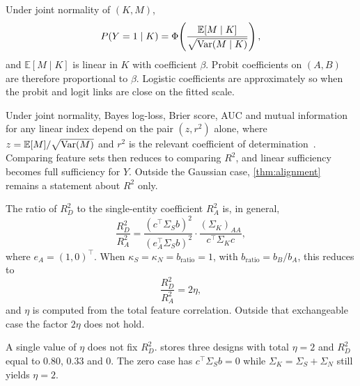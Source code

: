 \begin{lemma}
\label{lem:bridge}
Under joint normality of $(K,M)$,
\[
  P(Y=1\mid K)
  = \Phi\!\left(\frac{\mathbb{E}[M\mid K]}{\sqrt{\operatorname{Var}(M\mid K)}}\right),
\]
and $\mathbb{E}[M\mid K]$ is linear in $K$ with coefficient $\beta$.
Probit coefficients on $(A,B)$ are therefore proportional to $\beta$.
Logistic coefficients are approximately so when the probit and logit links are close on the fitted scale.
\end{lemma}

Under joint normality, Bayes log-loss, Brier score, AUC and mutual information for any linear index depend on the pair $(z,r^2)$ alone, where $z=\mathbb{E}[M]/\sqrt{\operatorname{Var}(M)}$ and $r^2$ is the relevant coefficient of determination~\parencite{falconer1965,lee2012}.
Comparing feature sets then reduces to comparing $R^2$, and linear sufficiency becomes full sufficiency for $Y$.
Outside the Gaussian case, \cref{thm:alignment} remains a statement about $R^2$ only.

The ratio of $R^2_D$ to the single-entity coefficient $R^2_A$ is, in general,
\begin{equation}
  \frac{R^2_D}{R^2_A}
  = \frac{(c^\top\Sigma_S b)^2}{(e_A^\top\Sigma_S b)^2}
    \cdot
    \frac{(\Sigma_K)_{AA}}{c^\top\Sigma_K c},
  \label{eq:r2_ratio_general}
\end{equation}
where $e_A=(1,0)^\top$.
When $\kappa_S=\kappa_N=b_{\mathrm{ratio}}=1$, with $b_{\mathrm{ratio}}=b_B/b_A$, this reduces to
\begin{equation}
  \frac{R^2_D}{R^2_A}
  = 2\eta,
  \label{eq:r2_ratio_exchangeable}
\end{equation}
and $\eta$ is computed from the total feature correlation.
Outside that exchangeable case the factor $2\eta$ does not hold.

A single value of $\eta$ does not fix $R^2_D$.
 stores three designs with total $\eta=2$ and $R^2_D$ equal to $0.80$, $0.33$ and $0$.
The zero case has $c^\top\Sigma_S b=0$ while $\Sigma_K=\Sigma_S+\Sigma_N$ still yields $\eta=2$.

